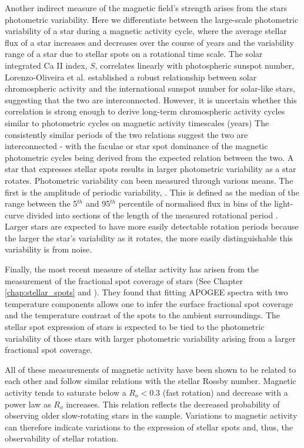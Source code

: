Another indirect measure of the magnetic field's strength arises from the stars photometric variability.
Here we differentiate between the large-scale photometric variability of a star during a magnetic activity cycle, where the average stellar flux of a star increases and decreases over the course of years and the variability range of a star due to stellar spots on a rotational time scale.
The solar integrated Ca II index, $S$, correlates linearly with photospheric sunspot number, Lorenzo-Oliveira et al. established a robust relationship between solar chromospheric activity and the international sunspot number for solar-like stars, suggesting that the two are interconnected. 
However, it is uncertain whether this correlation is strong enough to derive long-term chromospheric activity cycles similar to photometric cycles on magnetic activity timescales (years)
The consistently similar periods of the two relations suggest the two are interconnected - with the faculae or star spot dominance of the magnetic photometric cycles being derived from the expected relation between the two.
A star that expresses stellar spots results in larger photometric variability as a star rotates.
Photometric variability can been measured through various means.
The first is the amplitude of periodic variability, \rper{}.
This is defined as the median of the range between the 5$^{th}$ and 95$^{th}$ percentile of normalised flux in bins of the light-curve divided into sections of the length of the measured rotational period \citep{mcquillan_rotation_2014}.
Larger \rper{} stars are expected to have more easily detectable rotation periods because the larger the star's variability as it rotates, the more easily distinguishable this variability is from noise.

Finally, the most recent measure of stellar activity has arisen from the measurement of the fractional spot coverage of stars (See Chapter \ref{chap:stellar_spots} and \citep{cao_starspots_2022}).
They found that fitting APOGEE spectra with two temperature components allows one to infer the surface fractional spot coverage and the temperature contrast of the spots to the ambient surroundings.
The stellar spot expression of stars is expected to be tied to the photometric variability of those stars with larger photometric variability arising from a larger fractional spot coverage.

All of these measurements of magnetic activity have been shown to be related to each other and follow similar relations with the stellar Rossby number.
Magnetic activity tends to saturate below a $R_o<0.3$ \citep{cao_starspots_2022} (fast rotation) and decrease with a power law as $R_o$ increases.
This relation reflects the decreased probability of observing older slow-rotating stars in the \citet{mcquillan_rotation_2014} sample.
Variations to magnetic activity can therefore indicate variations to the expression of stellar spots and, thus, the observability of stellar rotation.

